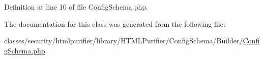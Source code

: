 Definition at line 10 of file Config\+Schema.\+php.



The documentation for this class was generated from the following file\+:\begin{DoxyCompactItemize}
\item 
classes/security/htmlpurifier/library/\+H\+T\+M\+L\+Purifier/\+Config\+Schema/\+Builder/\hyperlink{ConfigSchema_2Builder_2ConfigSchema_8php}{Config\+Schema.\+php}\end{DoxyCompactItemize}
